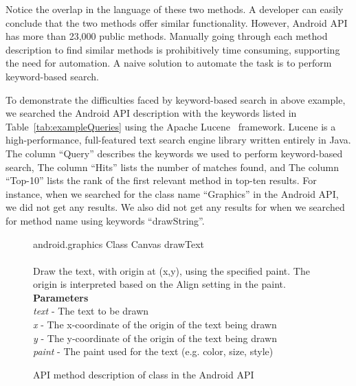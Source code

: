 Notice the overlap in the language of these two methods.
A developer can easily conclude that
the two methods offer similar functionality.
However, Android API has more than 23,000 public methods.
Manually going through each method description to find similar methods
is prohibitively time consuming, supporting the need for automation.
A naive solution to automate the task is to perform keyword-based search. 
 
To demonstrate the difficulties faced by keyword-based search in above example,
we searched the Android API description with the keywords listed in Table~\ref{tab:exampleQueries} using the Apache Lucene~\cite{lucene} framework.
Lucene is a high-performance, full-featured text search engine library written entirely in Java.
The column ``Query'' describes the keywords we used to perform keyword-based search,
The column ``Hits'' lists the number of matches found, and
The column ``Top-10'' lists the rank of the first relevant method in top-ten results.
For instance, when we searched for the class name ``Graphics'' in the Android API,
we did not get any results.
We also did not get any results for when we searched for method name using keywords ``drawString''. 

\begin{figure}
	\begin{framed}
		\begin{small}
			{\small android.graphics} {\normalsize Class Canvas} {\large drawText}\\
			\\
			Draw the text, with origin at (x,y), using the specified paint. The origin is interpreted based on the Align setting in the paint.\\
			\textbf{Parameters}\\
			\textit{text} - The text to be drawn\\
			\textit{x} - The x-coordinate of the origin of the text being drawn\\
			\textit{y} - The y-coordinate of the origin of the text being drawn\\
			\textit{paint} - The paint used for the text (e.g. color, size, style)
		\end{small}
	\end{framed}
	\caption{ API method description of  class in the Android API}
	\label{fig:drawTextJavadoc}
\end{figure}

